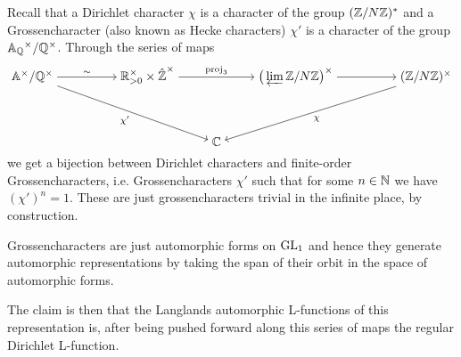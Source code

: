 \begin{example}
	Recall that a Dirichlet character \(\chi\) is a character of the group \((\Z/N\Z)^*\) and a Grossencharacter (also known as Hecke characters) \(\chi'\) is a character of the group \(\A_\Q^\times/\Q^\times\). Through the series of maps 
	\[\begin{tikzcd}[cramped]
		{\A^\times / \Q^\times} && {\R_{>0}^\times \times \hat{\Z}^\times} && {\big(\varprojlim\Z/N\Z\big)^\times } && { (\Z/N\Z)^\times} \\
		\\
		&&& \C
		\arrow["\sim",from=1-1, to=1-3]
		\arrow["{\chi'}"', from=1-1, to=3-4]
		\arrow["{\mathrm{proj}_3}", from=1-3, to=1-5]
		\arrow[from=1-5, to=1-7]
		\arrow["\chi", from=1-7, to=3-4]
	\end{tikzcd}\]
	we get a bijection between Dirichlet characters and finite-order Grossencharacters, i.e. Grossencharacters \(\chi'\) such that for some \(n\in \N\) we have \((\chi')^n = 1\). These are just grossencharacters trivial in the infinite place, by construction.
	
	Grossencharacters are just automorphic forms on \(\operatorname{GL}_1\) and hence they generate automorphic representations by taking the span of their orbit in the space of automorphic forms. 
	
	The claim is then that the Langlands automorphic L-functions of this representation is, after being pushed forward along this series of maps the regular Dirichlet L-function. 
\end{example}